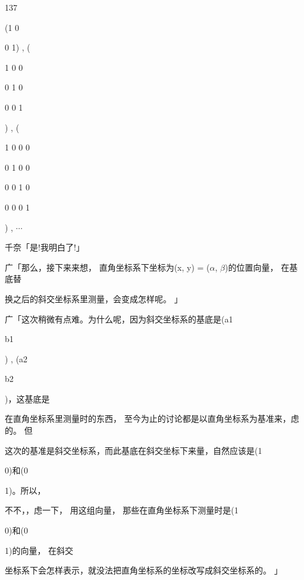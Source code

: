 137\par
(1 0\par
0 1) , (\par
1 0 0\par
0 1 0\par
0 0 1\par
) , (\par
1 0 0 0\par
0 1 0 0\par
0 0 1 0\par
0 0 0 1\par
) , $\cdots$\par
千奈「是!我明白了!」\par
广「那么，接下来来想， 直角坐标系下坐标为(x, y) = ($\alpha$, $\beta$)的位置向量， 在基底替\par
换之后的斜交坐标系里测量，会变成怎样呢。 」\par
广「这次稍微有点难。为什么呢，因为斜交坐标系的基底是(a1\par
b1\par
) , (a2\par
b2\par
)，这基底是\par
在直角坐标系里测量时的东西， 至今为止的讨论都是以直角坐标系为基准来，虑的。 但\par
这次的基准是斜交坐标系，而此基底在斜交坐标下来量，自然应该是(1\par
0)和(0\par
1)。所以，\par
不不，，虑一下， 用这组向量， 那些在直角坐标系下测量时是(1\par
0)和(0\par
1)的向量， 在斜交\par
坐标系下会怎样表示，就没法把直角坐标系的坐标改写成斜交坐标系的。 」\par


